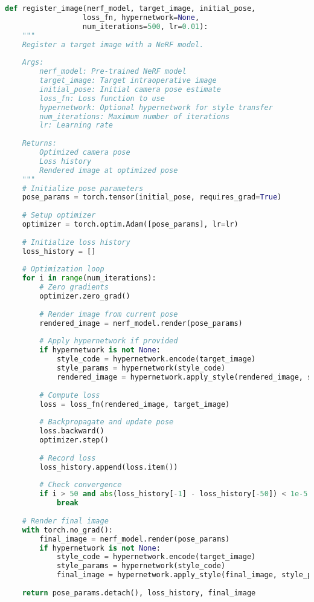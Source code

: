\begin{lstlisting}[language=Python]
def register_image(nerf_model, target_image, initial_pose, 
                  loss_fn, hypernetwork=None, 
                  num_iterations=500, lr=0.01):
    """
    Register a target image with a NeRF model.
    
    Args:
        nerf_model: Pre-trained NeRF model
        target_image: Target intraoperative image
        initial_pose: Initial camera pose estimate
        loss_fn: Loss function to use
        hypernetwork: Optional hypernetwork for style transfer
        num_iterations: Maximum number of iterations
        lr: Learning rate
        
    Returns:
        Optimized camera pose
        Loss history
        Rendered image at optimized pose
    """
    # Initialize pose parameters
    pose_params = torch.tensor(initial_pose, requires_grad=True)
    
    # Setup optimizer
    optimizer = torch.optim.Adam([pose_params], lr=lr)
    
    # Initialize loss history
    loss_history = []
    
    # Optimization loop
    for i in range(num_iterations):
        # Zero gradients
        optimizer.zero_grad()
        
        # Render image from current pose
        rendered_image = nerf_model.render(pose_params)
        
        # Apply hypernetwork if provided
        if hypernetwork is not None:
            style_code = hypernetwork.encode(target_image)
            style_params = hypernetwork(style_code)
            rendered_image = hypernetwork.apply_style(rendered_image, style_params)
        
        # Compute loss
        loss = loss_fn(rendered_image, target_image)
        
        # Backpropagate and update pose
        loss.backward()
        optimizer.step()
        
        # Record loss
        loss_history.append(loss.item())
        
        # Check convergence
        if i > 50 and abs(loss_history[-1] - loss_history[-50]) < 1e-5:
            break
    
    # Render final image
    with torch.no_grad():
        final_image = nerf_model.render(pose_params)
        if hypernetwork is not None:
            style_code = hypernetwork.encode(target_image)
            style_params = hypernetwork(style_code)
            final_image = hypernetwork.apply_style(final_image, style_params)
    
    return pose_params.detach(), loss_history, final_image
\end{lstlisting}

